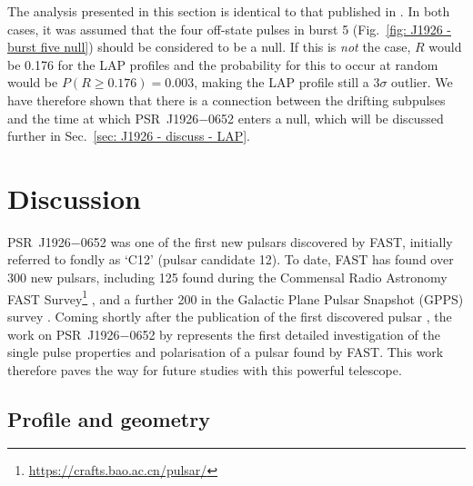 The analysis presented in this section is identical to that published in \citet{ZLH+2019}. In both cases, it was assumed that the four off-state pulses in burst 5 (Fig.~\ref{fig: J1926 - burst five null}) should be considered to be a null. If this is \textit{not} the case, $R$ would be 0.176 for the LAP profiles and the probability for this to occur at random would be $P(R\geq 0.176) = 0.003$, making the LAP profile still a $3\sigma$ outlier. We have therefore shown that there is a connection between the drifting subpulses and the time at which PSR~J1926$-$0652 enters a null, which will be discussed further in Sec.~\ref{sec: J1926 - discuss - LAP}.



















\section{Discussion}
\label{sec: J1926 - discussion}

PSR~J1926$-$0652 was one of the first new pulsars discovered by FAST, initially referred to fondly as `C12' (pulsar candidate 12). To date, FAST has found over 300 new pulsars, including 125 found during the Commensal Radio Astronomy FAST Survey\footnote{\url{https://crafts.bao.ac.cn/pulsar/}} \citep[CRAFTS;][]{LWQ+2018}, and a further 200 in the Galactic Plane Pulsar Snapshot (GPPS) survey \citep{HWW+2021}. Coming shortly after the publication of the first discovered pulsar \citep{QPL+2019}, the work on PSR~J1926$-$0652 by \citet{ZLH+2019} represents the first detailed investigation of the single pulse properties and polarisation of a pulsar found by FAST. This work therefore paves the way for future studies with this powerful telescope.

\subsection{Profile and geometry}
\label{sec: J1926 - discuss - geometry}

